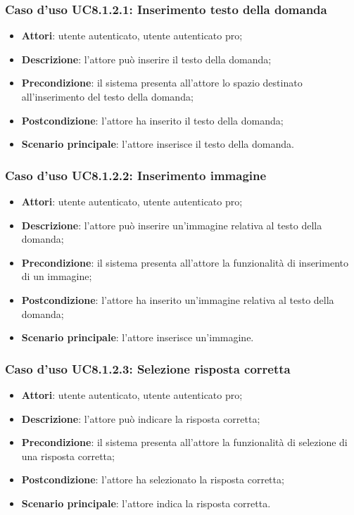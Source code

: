 \subsubsection{Caso d'uso UC8.1.2.1: Inserimento testo della domanda}
	\begin{itemize}
		\item
			\textbf{Attori}: utente autenticato, utente autenticato pro;
		\item		
			\textbf{Descrizione}: l'attore può inserire il testo della domanda;
		\item
			\textbf{Precondizione}: il sistema presenta all'attore lo spazio destinato all'inserimento del testo della domanda; 
		\item
			\textbf{Postcondizione}: l'attore ha inserito il testo della domanda;
		\item
			\textbf{Scenario principale}: l'attore inserisce il testo della domanda. 
	 			
	\end{itemize}
	
\subsubsection{Caso d'uso UC8.1.2.2: Inserimento immagine}
	\begin{itemize}
		\item
			\textbf{Attori}: utente autenticato, utente autenticato pro;
		\item		
			\textbf{Descrizione}: l'attore può inserire un'immagine relativa al testo della domanda;
		\item
			\textbf{Precondizione}: il sistema presenta all'attore la funzionalità di inserimento di un immagine; 
		\item
			\textbf{Postcondizione}: l'attore ha inserito un'immagine relativa al testo della domanda;
		\item
			\textbf{Scenario principale}: l'attore inserisce un'immagine.						
	\end{itemize}
	

\subsubsection{Caso d'uso UC8.1.2.3: Selezione risposta corretta}
	\begin{itemize}
		\item
			\textbf{Attori}: utente autenticato, utente autenticato pro;
		\item		
			\textbf{Descrizione}: l'attore può indicare la risposta corretta;
		\item
			\textbf{Precondizione}: il sistema presenta all'attore la funzionalità di selezione di una risposta corretta; 
		\item
			\textbf{Postcondizione}: l'attore ha selezionato la risposta corretta;
		\item
			\textbf{Scenario principale}: l'attore indica la risposta corretta.  			
	\end{itemize}